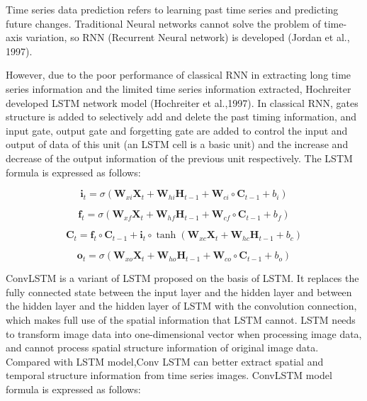 \documentclass[
]{article}
\begin{document}
Time series data prediction refers to learning past time series and
predicting future changes. Traditional Neural networks cannot solve the
problem of time-axis variation, so RNN (Recurrent Neural network) is
developed (Jordan et al., 1997).

However, due to the poor performance of classical RNN in extracting long
time series information and the limited time series information
extracted, Hochreiter developed LSTM network model (Hochreiter et
al.,1997). In classical RNN, gates structure is added to selectively add
and delete the past timing information, and input gate, output gate and
forgetting gate are added to control the input and output of data of
this unit (an LSTM cell is a basic unit) and the increase and decrease
of the output information of the previous unit respectively. The LSTM
formula is expressed as follows:

\begin{equation}
\mathbf{i}_t=\sigma(\mathbf{W}_{xi}\mathbf{X}_{t}+\mathbf{W}_{hi}\mathbf{H}_{t-1}+\mathbf{W}_{ci}\circ\mathbf{C}_{t-1}+b_i)
\end{equation}

\begin{equation}
\mathbf{f}_t=\sigma(\mathbf{W}_{xf}\mathbf{X}_{t}+\mathbf{W}_{hf}\mathbf{H}_{t-1}+\mathbf{W}_{cf}\circ\mathbf{C}_{t-1}+b_f) 
\end{equation}

\begin{equation}
\mathbf{C}_t=\mathbf{f}_{t}\circ\mathbf{C}_{t-1}+\mathbf{i}_t\circ\tanh(\mathbf{W}_{xc}\mathbf{X}_{t}+\mathbf{W}_{hc}\mathbf{H}_{t-1}+b_c)
\end{equation}

\begin{equation}
\mathbf{o}_t=\sigma(\mathbf{W}_{xo}\mathbf{X}_{t}+\mathbf{W}_{ho}\mathbf{H}_{t-1}+\mathbf{W}_{co}\circ\mathbf{C}_{t-1}+b_o)
\end{equation}

ConvLSTM is a variant of LSTM proposed on the basis of LSTM. It replaces
the fully connected state between the input layer and the hidden layer
and between the hidden layer and the hidden layer of LSTM with the
convolution connection, which makes full use of the spatial information
that LSTM cannot. LSTM needs to transform image data into
one-dimensional vector when processing image data, and cannot process
spatial structure information of original image data. Compared with LSTM
model,Conv LSTM can better extract spatial and temporal structure
information from time series images. ConvLSTM model formula is expressed
as follows:
\end{document}
